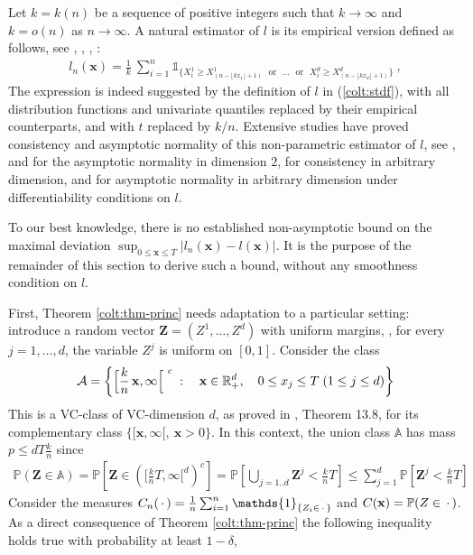 Let $k=k(n)$ be a sequence of positive integers such that $k \to
\infty$ and $k=o(n)$ as $n \to \infty$.
A natural estimator of $l$ is its empirical version defined as
follows,  see \cite{Huangphd}, \cite{Qi97}, \cite{Drees98}, \cite{Einmahl2006}:
\begin{align}
\label{colt:ln}
l_n(\mathbf{x})=\frac{1}{k}~\sum_{i=1}^{n} \mathds{1}_{\{X_i^1 \ge X^1_{(n-\lfloor kx_1 \rfloor+1)} \text{~~or~~} \ldots \text{~~or~~} X_i^d \ge X^d_{(n-\lfloor kx_d\rfloor+1)} \}}~,
\end{align}
\noindent
 The expression is indeed suggested by the definition of $l$ in
 (\ref{colt:stdf}), with all distribution functions and  univariate
 quantiles replaced by their empirical counterparts, and with $t$
 replaced by $k/n$. Extensive studies have proved consistency and 
 asymptotic normality of this non-parametric estimator of $l$, see \cite{Huangphd}, \cite{Drees98} and \cite{dHF06} for the asymptotic normality in dimension $2$, \cite{Qi97} for consistency in arbitrary dimension, and \cite{Einmahl2012} for asymptotic normality in arbitrary dimension under differentiability conditions on $l$.

To our best knowledge, there is no established non-asymptotic bound on the maximal deviation $\sup_{0 \le \mathbf{x} \le T} \left| l_n(\mathbf{x}) - l(\mathbf{x}) \right|$. It is the purpose of the remainder of this section to derive such a bound, without any smoothness condition on $l$.

First, Theorem \ref{colt:thm-princ} needs adaptation  to a   particular
setting: introduce  a random vector 
$\mathbf{Z}=(Z^1,\ldots,Z^d)$ with uniform margins, \ie, for every
$j=1,\ldots,d$, the variable $Z^j$ is uniform on $[0,1]$.  Consider
the class 
\[
\mathcal{A} = \left\{ \Big[  \frac{k}{n}\,
  \mathbf{x},\infty\Big[^{~c} \;:\quad \mathbf x \in \mathbb{R}^d_+ , \quad 0 \le x_j
\le T \; (1\le j\le d) \right\}
\]
This is a VC-class of
VC-dimension $d$,  as proved in \cite{Devroye96}, Theorem 13.8, for
its complementary class  $\big\{[\mathbf{x},\infty[ ,~ \mathbf{x}>0
\big\}$. %
In this context, the union class $\mathbb{A}$ has mass $p \le dT\frac{k}{n}$ since 
\begin{align*}
\mathbb{P}(\mathbf{Z} \in \mathbb{A}) = \mathbb{P} \left[ \mathbf{Z} \in \left(\Big[\frac{k}{n}T,\infty\Big[^d\right)^c\right] = \mathbb{P} \left[ \bigcup_{j=1..d} \mathbf{Z}^j < \frac{k}{n}T \right] \le \sum_{j=1}^d \mathbb{P} \left[ \mathbf{Z}^j < \frac{k}{n}T \right]
\end{align*}
\noindent
Consider the measures $C_n(\point)=\frac{1}{n} \sum_{i=1}^{n}
\mathds{1}_{\{Z_i \in \point \}}$ and $C(\mathbf{x})=\mathbb{P}(Z \in
\,\cdot\,)$. As a direct consequence of Theorem \ref{colt:thm-princ} the
following inequality holds true  with probability at least $1-\delta$,

